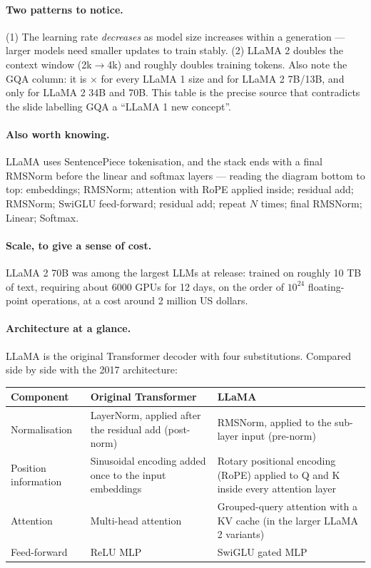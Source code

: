 \documentclass[11pt,a4paper]{article}
\begin{document}
\paragraph{Two patterns to notice.} (1) The learning rate \emph{decreases} as model size
increases within a generation --- larger models need smaller updates to train stably.
(2) LLaMA 2 doubles the context window (2k$\rightarrow$4k) and roughly doubles training
tokens. Also note the GQA column: it is $\times$ for every LLaMA 1 size and for LLaMA 2
7B/13B, and \checkmark only for LLaMA 2 34B and 70B. This table is the precise source that
contradicts the slide labelling GQA a ``LLaMA 1 new concept''.

\paragraph{Also worth knowing.} LLaMA uses SentencePiece tokenisation, and the stack ends with
a final RMSNorm before the linear and softmax layers --- reading the diagram bottom to top:
embeddings; RMSNorm; attention with RoPE applied inside; residual add; RMSNorm; SwiGLU
feed-forward; residual add; repeat $N$ times; final RMSNorm; Linear; Softmax.

\paragraph{Scale, to give a sense of cost.} LLaMA 2 70B was among the largest LLMs at
release: trained on roughly 10 TB of text, requiring about 6000 GPUs for 12 days, on the
order of $10^{24}$ floating-point operations, at a cost around 2 million US dollars.

\paragraph{Architecture at a glance.} LLaMA is the original Transformer decoder with four
substitutions. Compared side by side with the 2017 architecture:
\begin{center}
\begin{tabularx}{\textwidth}{lYY}
\textbf{Component} & \textbf{Original Transformer} & \textbf{LLaMA} \\
\hline
Normalisation & LayerNorm, applied after the residual add (post-norm) &
RMSNorm, applied to the sub-layer input (pre-norm) \\
Position information & Sinusoidal encoding added once to the input embeddings &
Rotary positional encoding (RoPE) applied to Q and K inside every attention layer \\
Attention & Multi-head attention & Grouped-query attention with a KV cache
(in the larger LLaMA 2 variants) \\
Feed-forward & ReLU MLP & SwiGLU gated MLP \\
\end{tabularx}
\end{center}
\end{document}
